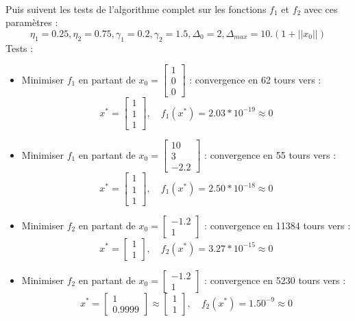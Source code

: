 \documentclass[12pt]{article}	%
\begin{document}
\paragraph{}
Puis suivent les tests de l'algorithme complet sur les fonctions $f_1$ et $f_2$ avec ces paramètres :
	\[\eta_1 = 0.25, \eta_2 = 0.75, \gamma_1 = 0.2, \gamma_2 = 1.5, \Delta_0 = 2, \Delta_{max} = 10.(1 + ||x_0||)\]
Tests :
\begin{itemize}
	\item Minimiser $f_1$ en partant de $x_0 = \left[\begin{array}{c}1\\0\\0\end{array}\right]$ : convergence en 62 tours vers :
			\[x^* = \left[\begin{array}{c}1\\1\\1\end{array}\right],\quad f_1(x^*) = 2.03*10^{-19} \approx 0\]
	\item Minimiser $f_1$ en partant de $x_0 = \left[\begin{array}{c}10\\3\\-2.2\end{array}\right]$ : convergence en 55 tours vers :
			\[x^* = \left[\begin{array}{c}1\\1\\1\end{array}\right],\quad f_1(x^*) = 2.50*10^{-18} \approx 0\]
	\item Minimiser $f_2$ en partant de $x_0 = \left[\begin{array}{c}-1.2\\1\end{array}\right]$ : convergence en 11384 tours vers :
			\[x^* = \left[\begin{array}{c}1\\1\end{array}\right],\quad f_2(x^*) = 3.27*10^{-15} \approx 0\]
	\item Minimiser $f_2$ en partant de $x_0 = \left[\begin{array}{c}-1.2\\1\end{array}\right]$ : convergence en 5230 tours vers :
			\[x^* = \left[\begin{array}{c}1\\0.9999\end{array}\right] \approx \left[\begin{array}{c}1\\1\end{array}\right],\quad f_2(x^*) = 1.50^{-9} \approx 0\]

\end{itemize}
\end{document}
